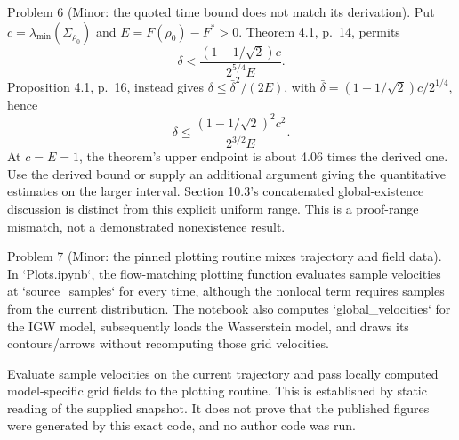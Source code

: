\documentclass[10pt]{article}
\begin{document}
Problem 6 (Minor: the quoted time bound does not match its derivation).  Put \(c=\lambda_{\min}(\Sigma_{\rho_0})\) and \(E=F(\rho_0)-F^*>0\). Theorem 4.1, p. 14, permits \[\delta<\frac{(1-1/\sqrt2)c}{2^{5/4}E}.\] Proposition 4.1, p. 16, instead gives \(\delta\le\bar\delta^2/(2E)\), with \(\bar\delta=(1-1/\sqrt2)c/2^{1/4}\), hence \[\delta\le\frac{(1-1/\sqrt2)^2c^2}{2^{3/2}E}.\] At \(c=E=1\), the theorem’s upper endpoint is about 4.06 times the derived one. Use the derived bound or supply an additional argument giving the quantitative estimates on the larger interval. Section 10.3’s concatenated global-existence discussion is distinct from this explicit uniform range. This is a proof-range mismatch, not a demonstrated nonexistence result.\par
Problem 7 (Minor: the pinned plotting routine mixes trajectory and field data).  In `Plots.ipynb`, the flow-matching plotting function evaluates sample velocities at `source\_samples` for every time, although the nonlocal term requires samples from the current distribution. The notebook also computes `global\_velocities` for the IGW model, subsequently loads the Wasserstein model, and draws its contours/arrows without recomputing those grid velocities.\par
Evaluate sample velocities on the current trajectory and pass locally computed model-specific grid fields to the plotting routine. This is established by static reading of the supplied snapshot. It does not prove that the published figures were generated by this exact code, and no author code was run.\par
\end{document}
